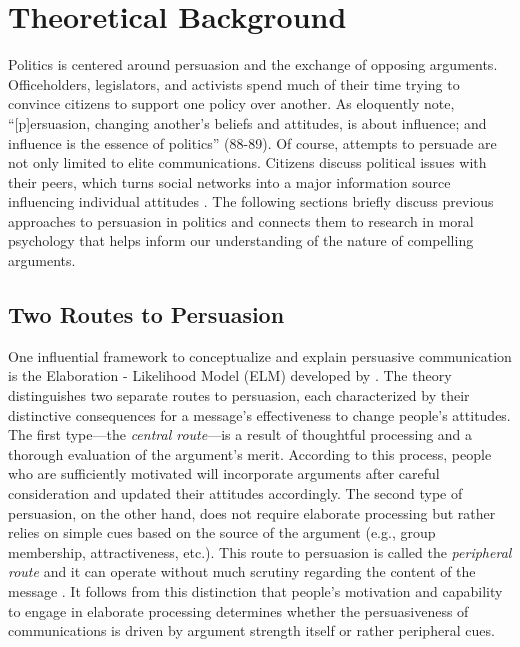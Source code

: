 \section{Theoretical Background}

Politics is centered around persuasion and the exchange of opposing arguments. Officeholders, legislators, and activists spend much of their time trying to convince citizens to support one policy over another. As \citet{cobb1997changing} eloquently note, ``[p]ersuasion, changing another's beliefs and attitudes, is about influence; and influence is the essence of politics'' (88-89). Of course, attempts to persuade are not only limited to elite communications. Citizens discuss political issues with their peers, which turns social networks into a major information source influencing individual attitudes \citep[e.g.,][]{huckfeldt1995political,ahn2010communication,lazer2010coevolution}. The following sections briefly discuss previous approaches to persuasion in politics and connects them to research in moral psychology that helps inform our understanding of the nature of compelling arguments.



\subsection{Two Routes to Persuasion}

One influential framework to conceptualize and explain persuasive communication is the Elaboration - Likelihood Model (ELM) developed by \citet{petty1986communication,petty1986elaboration}. The theory distinguishes two separate routes to persuasion, each characterized by their distinctive consequences for a message's effectiveness to change people's attitudes. The first type---the \textit{central route}---is a result of thoughtful processing and a thorough evaluation of the argument's merit. According to this process, people who are sufficiently motivated will incorporate arguments after careful consideration and updated their attitudes accordingly. The second type of persuasion, on the other hand, does not require elaborate processing but rather relies on simple cues based on the source of the argument (e.g., group membership, attractiveness, etc.). This route to persuasion is called the \textit{peripheral route} and it can operate without much scrutiny regarding the content of the message \citep[see also][for a similar distinction between systematic and heuristic processing]{chaiken1989heuristic}. It follows from this distinction that people's motivation and capability to engage in elaborate processing determines whether the persuasiveness of communications is driven by argument strength itself or rather peripheral cues.

